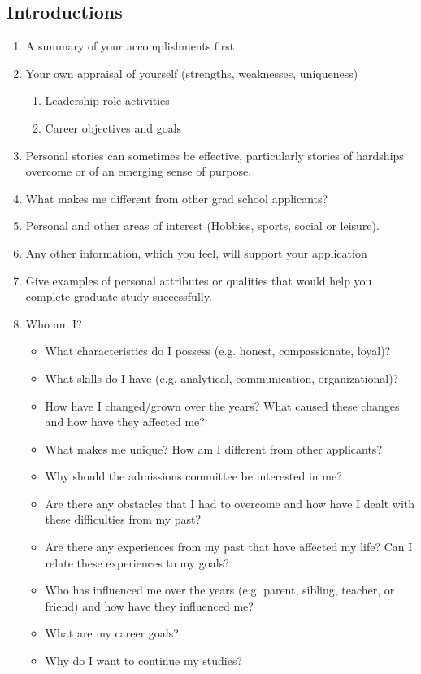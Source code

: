 \documentclass[a4paper,12pt]{article}%
\begin{document}
\subsection{Introductions}
\label{sec:Introductions}
\begin{enumerate}
	\item	A summary of your accomplishments first	
	\item 	Your own appraisal of yourself (strengths, weaknesses, uniqueness)
		\begin{enumerate}
			\item 	Leadership role activities
			\item 	Career objectives and goals	
		\end{enumerate}
	  \hrulefill
	  \hrulefill
\item Personal stories can sometimes be effective, particularly stories of hardships overcome or of an emerging sense of purpose. \\
\hrulefill

	  \hrulefill
	  
\item  	What makes me different from other grad school applicants?
	\item  	Personal and other areas of interest (Hobbies, sports, social or leisure).
	\item  	Any other information, which you feel, will support your application
	\item Give examples of personal attributes or qualities that would help you complete graduate study successfully. \\
		  \hrulefill
		  
	  \hrulefill
	  
\item  Who am I?		
\begin{itemize}
	\item What characteristics do I possess (e.g. honest, compassionate, loyal)?
	\item What skills do I have (e.g. analytical, communication, organizational)?
	\item How have I changed/grown over the years? What caused these changes and how have they affected me?
	\item What makes me unique? How am I different from other applicants?
	\item Why should the admissions committee be interested in me?
	\item Are there any obstacles that I had to overcome and how have I dealt with these difficulties from my past?
	\item Are there any experiences from my past that have affected my life? Can I relate these experiences to my goals?
	\item Who has influenced me over the years (e.g. parent, sibling, teacher, or friend) and how have they influenced me?
	\item What are my career goals?
	\item Why do I want to continue my studies?
\end{itemize}
 	  \hrulefill
 	  
		  \hrulefill
		  
	\end{enumerate}
	  \hrulefill
	  
\end{document}
